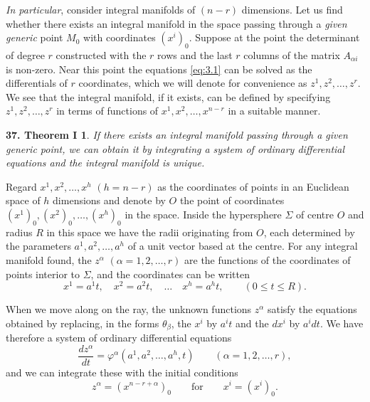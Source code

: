 \emph{In particular}, consider integral manifolds of $(n-r)$ dimensions.  Let us find whether there exists an integral manifold in the space passing through a \emph{given generic} point $M_{0}$ with coordinates $(x^{i})_{0}$. Suppose at the point the determinant of degree $r$ constructed with the $r$ rows and the last $r$ columns of the matrix $A_{\alpha i}$ is non-zero.  Near this point the equations \eqref{eq:3.1} can be solved as the differentials of  $r$ coordinates, which we will denote for convenience as $z^{1},z^{2},\dots,z^{r}$. We see that the integral manifold, if it exists, can be defined by specifying  $z^{1},z^{2},\dots,z^{r}$ in terms of functions of $x^{1},x^{2},\dots,x^{n-r}$ in a suitable manner.

\vspace{12pt}\addtocounter{frenchsec}{1}
\theoremstyle{shape1}
\newtheorem*{thm37}{\hspace{15pt}\textbf{37.} Theorem I}
\begin{thm37}
  If there exists an integral manifold passing through a given generic point, we can obtain it by integrating a system of ordinary differential equations and the integral manifold is unique.
\end{thm37}

Regard $x^{1},x^{2},\dots,x^{h}$ $(h=n-r)$ as the coordinates of points in an Euclidean space of $h$ dimensions and denote by $O$ the point of coordinates $(x^{1})_{0},(x^{2})_{0},\dots,(x^{h})_{0}$ in the space. Inside the hypersphere $\Sigma$ of centre $O$ and radius $R$ in this space we have the radii originating from $O$, each determined by the parameters $a^{1},a^{2},\dots,a^{h}$ of a unit vector based at the centre. For any integral manifold found, the $z^{\alpha}$ $(\alpha=1,2,\dots,r)$ are the functions of the coordinates of points interior to $\Sigma$, and the coordinates can be written
\[
x^{1}=a^{1}t,\quad x^{2}=a^{2}t,\quad\dots\quad x^{h}=a^{h}t,\qquad(0\le t\le R).
\] 

When we move along on the ray, the unknown functions $z^{\alpha}$ satisfy the equations obtained by replacing, in the forms $\theta_{\beta}$, the $x^{i}$ by $a^{i}t$ and the $dx^{i}$ by $a^{i}dt$. We have therefore a system of ordinary differential equations
\begin{equation}
  \label{eq:3.2}
  \frac{d z^{\alpha}}{dt}=\varphi^{\alpha}(a^{1},a^{2},\dots,a^{h},t)\qquad(\alpha=1,2,\dots,r),
\end{equation}
and we can integrate these with the initial conditions
\[
z^{\alpha}=(x^{n-r+\alpha})_{0}\qquad\text{for}\qquad x^{i}=(x^{i})_{0}.
\]

